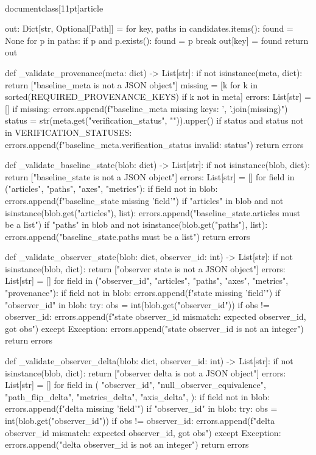 \\documentclass[11pt]{article}
\begin{document}
\begin{CodeBlock}
    out: Dict[str, Optional[Path]] = {}
    for key, paths in candidates.items():
        found = None
        for p in paths:
            if p and p.exists():
                found = p
                break
        out[key] = found
    return out


def _validate_provenance(meta: dict) -> List[str]:
    if not isinstance(meta, dict):
        return ["baseline_meta is not a JSON object"]
    missing = [k for k in sorted(REQUIRED_PROVENANCE_KEYS) if k not in meta]
    errors: List[str] = []
    if missing:
        errors.append(f"baseline_meta missing keys: {', '.join(missing)}")
    status = str(meta.get("verification_status", "")).upper()
    if status and status not in VERIFICATION_STATUSES:
        errors.append(f"baseline_meta.verification_status invalid: {status}")
    return errors


def _validate_baseline_state(blob: dict) -> List[str]:
    if not isinstance(blob, dict):
        return ["baseline_state is not a JSON object"]
    errors: List[str] = []
    for field in ("articles", "paths", "axes", "metrics"):
        if field not in blob:
            errors.append(f"baseline_state missing '{field}'")
    if "articles" in blob and not isinstance(blob.get("articles"), list):
        errors.append("baseline_state.articles must be a list")
    if "paths" in blob and not isinstance(blob.get("paths"), list):
        errors.append("baseline_state.paths must be a list")
    return errors


def _validate_observer_state(blob: dict, observer_id: int) -> List[str]:
    if not isinstance(blob, dict):
        return ["observer state is not a JSON object"]
    errors: List[str] = []
    for field in ("observer_id", "articles", "paths", "axes", "metrics", "provenance"):
        if field not in blob:
            errors.append(f"state missing '{field}'")
    if "observer_id" in blob:
        try:
            obs = int(blob.get("observer_id"))
            if obs != observer_id:
                errors.append(f"state observer_id mismatch: expected {observer_id}, got {obs}")
        except Exception:
            errors.append("state observer_id is not an integer")
    return errors


def _validate_observer_delta(blob: dict, observer_id: int) -> List[str]:
    if not isinstance(blob, dict):
        return ["observer delta is not a JSON object"]
    errors: List[str] = []
    for field in (
        "observer_id",
        "null_observer_equivalence",
        "path_flip_delta",
        "metrics_delta",
        "axis_delta",
    ):
        if field not in blob:
            errors.append(f"delta missing '{field}'")
    if "observer_id" in blob:
        try:
            obs = int(blob.get("observer_id"))
            if obs != observer_id:
                errors.append(f"delta observer_id mismatch: expected {observer_id}, got {obs}")
        except Exception:
            errors.append("delta observer_id is not an integer")
    return errors



\end{CodeBlock}
\end{document}
